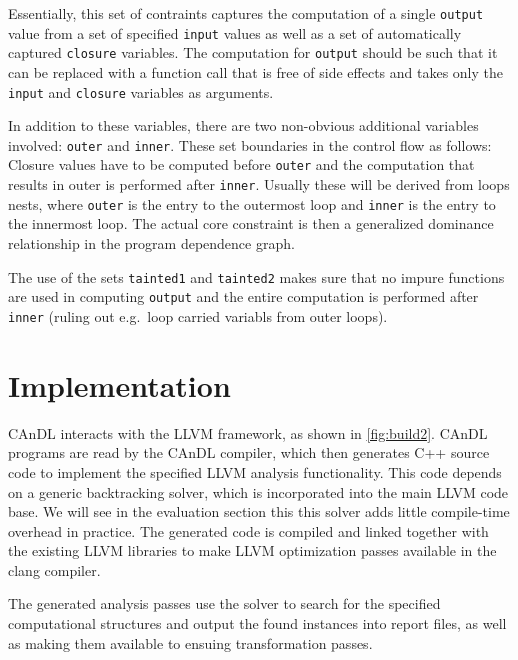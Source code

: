     Essentially, this set of contraints captures the computation of a
    single \texttt{output} value from a set of specified \texttt{input}
    values as well as a set of automatically captured \texttt{closure}
    variables.  The computation for \texttt{output} should be such that it
    can be replaced with a function call that is free of side effects and
    takes only the \texttt{input} and \texttt{closure} variables as
    arguments.

    In addition to these variables, there are two non-obvious additional
    variables involved: \texttt{outer} and \texttt{inner}.
    These set boundaries in the control flow as follows: Closure values have to
    be computed before \texttt{outer} and the computation that results in outer
    is performed after \texttt{inner}.
    Usually these will be derived from loops nests, where \texttt{outer} is the
    entry to the outermost loop and \texttt{inner} is the entry to the innermost
    loop.
    The actual core constraint is then a generalized dominance relationship in
    the program dependence graph.

    The use of the sets \texttt{tainted1} and \texttt{tainted2} makes sure that
    no impure functions are used in computing \texttt{output} and the entire
    computation is performed after \texttt{inner} (ruling out e.g.\ loop carried
    variabls from outer loops).

\section{Implementation}

    CAnDL interacts with the LLVM framework, as shown in \autoref{fig:build2}.
    CAnDL programs are read by the CAnDL compiler, which then generates C++
    source code to implement the specified LLVM analysis functionality.
    This code depends on a generic backtracking solver, which is incorporated
    into the main LLVM code base. 
    We will see in the evaluation section this this solver adds little
    compile-time overhead in practice.
    The generated code is compiled and linked together with the existing LLVM
    libraries to make LLVM optimization passes available in the clang compiler.

    The generated analysis passes use the solver to search for the specified
    computational structures and output the found instances into report files,
    as well as making them available to ensuing transformation passes.

